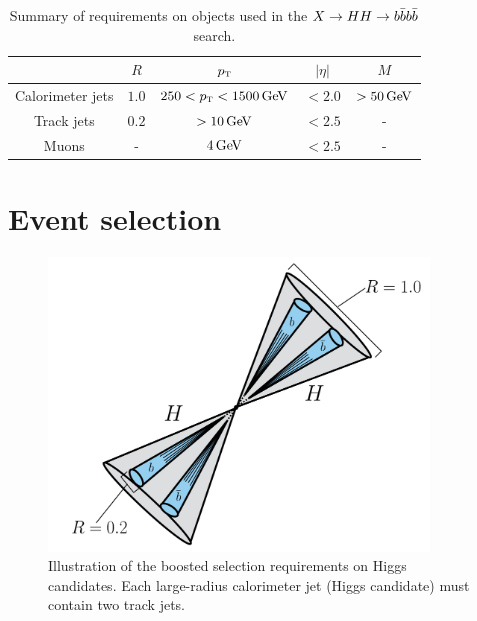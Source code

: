 \begin{table}[h!]
\centering
\captionsetup{justification=centering}

\hspace{-10pt}
\begin{tabular}{|c|c|c|c|c|}
\hline
& $R$ & $p_{\textrm{\footnotesize\sc t}} $ & $|\eta|$ & $M$ \\ \hline
Calorimeter jets & $1.0$ & $250 < \pT < 1500 \GeV$ & $ < 2.0$ & $ > 50 \GeV$ \\ \hline
Track jets & $0.2$ & $> 10 \GeV$ & $< 2.5$ & - \\ \hline
Muons & - & $4 \GeV$ & $< 2.5$ & - \\ \hline
\end{tabular}

\caption{
Summary of requirements on objects used in the $X\to HH \to b\bar{b}b\bar{b}$ search.
}
\label{tab:4b_req}
\end{table}

\section{Event selection}

\begin{figure}[h!]
  \centering
  \captionsetup{justification=centering}

  \includegraphics[width=0.9\textwidth]{figures/Boosted_HH_cartoon}
  \caption{Illustration of the boosted selection requirements on Higgs candidates. Each large-radius calorimeter jet (Higgs candidate) must contain two track jets.}
  \label{fig:BoostedCartoon}
\end{figure}

